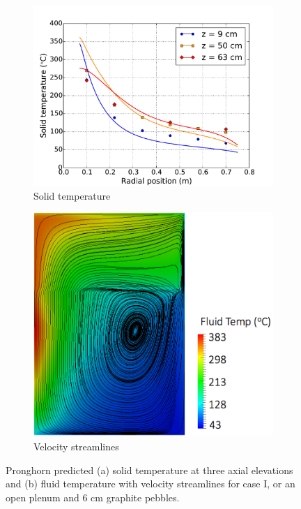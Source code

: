 \begin{figure}[h!]
    \begin{subfigure}{0.5\linewidth}
        \centering
        \includegraphics[height=0.75\linewidth]{figs/piecewise_A3.pdf}
       \caption{Solid temperature}
       \label{fig:plenuma}
    \end{subfigure}
        \begin{subfigure}{0.5\linewidth}
        \centering
        \includegraphics[height=0.75\linewidth]{figs/A3_streamlines.png}
       \caption{Velocity streamlines}
       \label{fig:plenumb}
    \end{subfigure}
    \caption{Pronghorn predicted (a) solid temperature at three axial elevations and (b) fluid temperature with velocity streamlines for case I, or an open plenum and 6 \si{\centi\meter} graphite pebbles.}
    \label{fig:plenum}
\end{figure}

